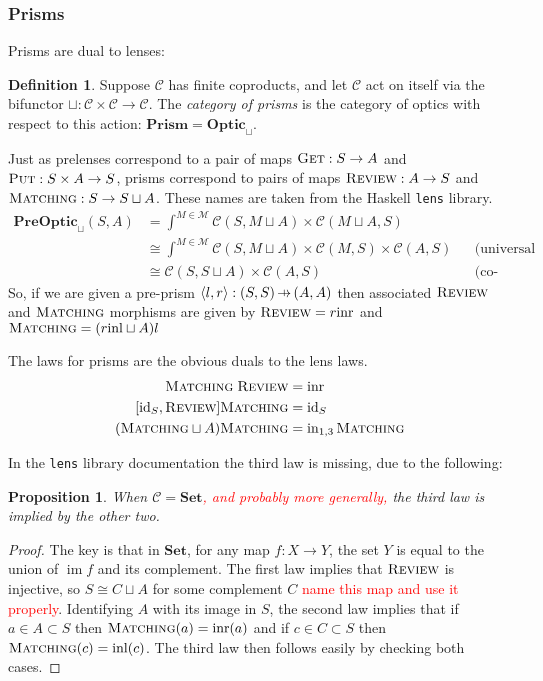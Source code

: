 \documentclass[11pt,a4paper]{article}
\theoremstyle{plain}
\newtheorem{proposition}[theorem]{Proposition}
\theoremstyle{definition}
\newtheorem{definition}[theorem]{Definition}
\newcommand{\C}{\mathscr{C}}
\newcommand{\M}{\mathscr{M}}
\newcommand{\Set}{\mathbf{Set}}
\newcommand{\PreOptic}{\mathbf{PreOptic}}
\newcommand{\Optic}{\mathbf{Optic}}
\newcommand{\Prism}{\mathbf{Prism}}
\newcommand{\id}{\mathrm{id}}
\newcommand{\inl}{\mathrm{inl}}
\newcommand{\inr}{\mathrm{inr}}
\DeclareMathOperator{\im}{im}
\newcommand{\fget}{\textsc{Get}}
\newcommand{\fput}{\textsc{Put}}
\newcommand{\freview}{\textsc{Review}}
\newcommand{\fmatching}{\textsc{Matching}}
\newcommand{\hto}{\ensuremath{\,\mathaccent\shortmid\rightarrow\,}}
\newcommand{\todo}[1]{\textcolor{red}{\small #1}}
\begin{document}
\subsubsection{Prisms}
Prisms are dual to lenses:

\begin{definition}
Suppose $\C$ has finite coproducts, and let $\C$ act on itself via the bifunctor $\sqcup : \C \times \C \to \C$. The \emph{category of prisms} is the category of optics with respect to this action: $\Prism = \Optic_\sqcup$.
\end{definition}

Just as prelenses correspond to a pair of maps $\fget : S \to A$ and $\fput : S \times A \to S$, prisms correspond to pairs of maps $\freview : A \to S$ and $\fmatching : S \to S \sqcup A$. These names are taken from the Haskell \texttt{lens} library.
\begin{align*}
\PreOptic_\sqcup(S, A) &= \int^{M \in \M} \C(S, M \sqcup A) \times \C(M \sqcup A, S) \\
&\cong \int^{M \in \M} \C(S, M \sqcup A) \times \C(M, S) \times \C(A, S) && \text{(universal property of coproduct)} \\
&\cong \C(S, S \sqcup A) \times \C(A, S) && \text{(co-Yoneda)}
\end{align*}
So, if we are given a pre-prism $\langle l, r \rangle : (S, S) \hto (A, A)$ then associated $\freview$ and $\fmatching$ morphisms are given by $\freview = r \inr$ and $\fmatching = (r\inl \sqcup A)l$

The laws for prisms are the obvious duals to the lens laws. 
\begin{align*}
\fmatching \; \freview &= \inr \\
[\id_S, \freview] \fmatching &= \id_S \\
(\fmatching \sqcup A) \fmatching &= \mathrm{in}_{1,3} \, \fmatching
\end{align*}

In the \texttt{lens} library documentation the third law is missing, due to the following:

\begin{proposition}
When $\C = \Set$\todo{, and probably more generally,} the third law is implied by the other two.
\end{proposition}
\begin{proof}
The key is that in $\Set$, for any map $f : X \to Y$, the set $Y$ is equal to the union of $\im f$ and its complement. The first law implies that $\freview$ is injective, so $S \cong C \sqcup A$ for some complement $C$ \todo{name this map and use it properly}. Identifying $A$ with its image in $S$, the second law implies that if $a\in A \subset S$ then $\fmatching(a) = \inr(a)$ and if $c\in C \subset S$ then $\fmatching(c) = \inl(c)$. The third law then follows easily by checking both cases.
\end{proof}
\end{document}
